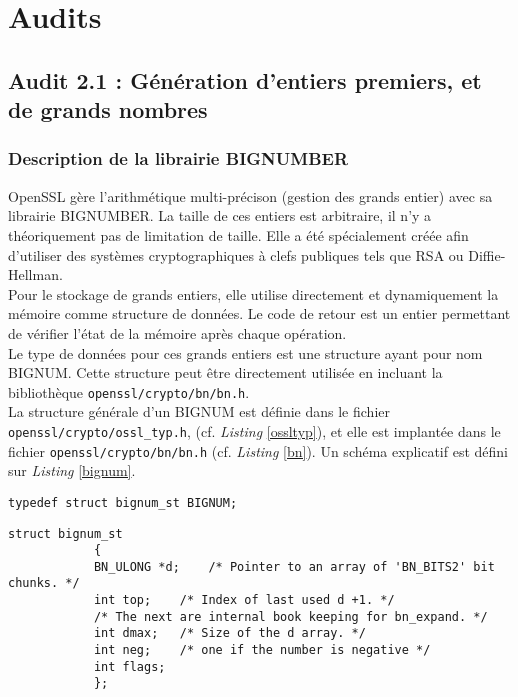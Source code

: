 \section{Audits}

	\subsection{Audit 2.1 : Génération d'entiers premiers, et de grands nombres}

		\subsubsection{Description de la librairie BIGNUMBER}

			OpenSSL gère l'arithmétique multi-précison (gestion des grands entier) avec sa librairie BIGNUMBER. La taille de ces entiers est arbitraire, il n'y a théoriquement pas de limitation de taille. Elle a été spécialement créée afin d'utiliser des systèmes cryptographiques à clefs publiques tels que RSA ou Diffie-Hellman.\\

			Pour le stockage de grands entiers, elle utilise directement et dynamiquement la mémoire comme structure de données. Le code de retour est un entier permettant de vérifier l'état de la mémoire après chaque opération.\\

			Le type de données pour ces grands entiers est une structure ayant pour nom BIGNUM. Cette structure peut être directement utilisée en incluant la bibliothèque \texttt{openssl/crypto/bn/bn.h}.\\

			La structure générale d'un BIGNUM est définie dans le fichier \texttt{openssl/crypto/ossl\_typ.h}, (cf. \textit{Listing} \ref{ossltyp}), et elle est implantée dans le fichier \texttt{openssl/crypto/bn/bn.h} (cf. \textit{Listing} \ref{bn}). Un schéma explicatif est défini sur \textit{Listing} \ref{bignum}.

			\begin{lstlisting}[style=customc,caption=ossl\_typ.h, label=ossltyp]
			typedef struct bignum_st BIGNUM;
			\end{lstlisting}

			\begin{lstlisting}[style=customc,caption=bn.h, label=bn]
			struct bignum_st
			{
			BN_ULONG *d;	/* Pointer to an array of 'BN_BITS2' bit chunks. */
			int top;	/* Index of last used d +1. */
			/* The next are internal book keeping for bn_expand. */
			int dmax;	/* Size of the d array. */
			int neg;	/* one if the number is negative */
			int flags;
			};
			\end{lstlisting}

